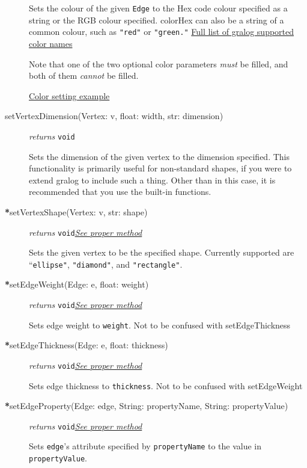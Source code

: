\documentclass{article}
\newcounter{example}
\newlength\q
\begin{document}
\begin{description}
Sets the colour of the given \texttt{Edge} to the Hex code colour
specified as a string or the RGB colour specified. colorHex can also be
a string of a common colour, such as \texttt{"red"} or
\texttt{"green."} \hyperref[colorNamesSupportedByGralog]{Full list of gralog supported color names}

Note that one of the two optional color parameters \textit{must} be filled, and both of them \textit{cannot} be filled.

\hyperref[colorNamesSupportedByGralog]{Color setting example}



  
\item[setVertexDimension(Vertex: v, float: width, str: dimension)]\emph{returns} \texttt{void}

Sets the dimension of the given vertex to the dimension specified. This functionality is primarily useful for non-standard shapes, if you were to extend gralog to include such a thing. Other than in this case, it is recommended that you use the built-in functions.

\item[\textbf{*}setVertexShape(Vertex: v, str: shape)] \emph{returns} \texttt{void}\quad \hyperref[setVertexShapeClass]{\textit{See proper method}}


Sets the given vertex to be the specified shape. Currently supported
are ``\texttt{ellipse"}, \texttt{"diamond"}, and \texttt{"rectangle"}.

\item[\textbf{*}setEdgeWeight(Edge: e, float: weight)] \emph{returns} \texttt{void}\quad \hyperref[setEdgeWeightClass]{\textit{See proper method}}


Sets edge weight to \texttt{weight}. Not to be confused with setEdgeThickness

\item[\textbf{*}setEdgeThickness(Edge: e, float: thickness)] \emph{returns} \texttt{void}\quad \hyperref[setEdgeThiccnessClass]{\textit{See proper method}}


Sets edge thickness to \texttt{thickness}. Not to be confused with setEdgeWeight

\item[\textbf{*}setEdgeProperty(Edge: edge, String: propertyName, String: propertyValue)] \emph{returns} \texttt{void}\quad \hyperref[setEdgePropertyClass]{\textit{See proper method}}


Sets \texttt{edge}'s attribute specified by \texttt{propertyName} to the value in \texttt{propertyValue}.


\end{description}
\end{document}
